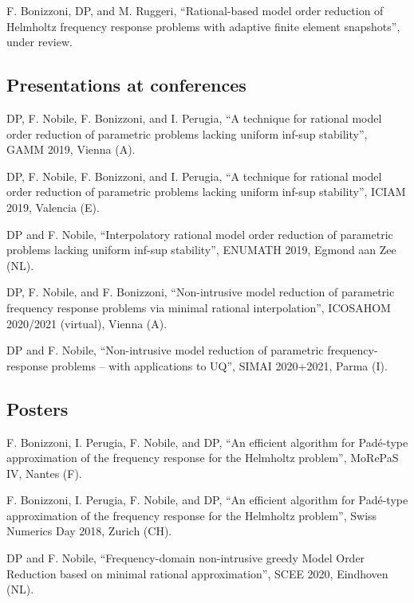\documentclass[11pt]{article} %
\begin{document}
F. Bonizzoni, DP, and M. Ruggeri, ``Rational-based model order reduction of Helmholtz frequency response problems with adaptive finite element snapshots'', under review.

\subsection*{Presentations at conferences}

\hspace{\parindent}DP, F. Nobile, F. Bonizzoni, and I. Perugia, ``A technique for rational model order reduction of parametric problems lacking uniform inf-sup stability'', GAMM 2019, Vienna (A).

DP, F. Nobile, F. Bonizzoni, and I. Perugia, ``A technique for rational model order reduction of parametric problems lacking uniform inf-sup stability'', ICIAM 2019, Valencia (E).

\yearsminus DP and F. Nobile, ``Interpolatory rational model order reduction of parametric problems lacking uniform inf-sup stability'', \mbox{ENUMATH} 2019, Egmond aan Zee (NL).

DP, F. Nobile, and F. Bonizzoni, ``Non-intrusive model reduction of parametric frequency response problems via minimal rational interpolation'', \mbox{ICOSAHOM} 2020/2021 (virtual), Vienna (A).

\yearsminus DP and F. Nobile, ``Non-intrusive model reduction of parametric frequency-response problems -- with applications to UQ'', SIMAI 2020+2021, Parma (I).

\subsection*{Posters}

\hspace{\parindent}F. Bonizzoni, I. Perugia, F. Nobile, and DP, ``An efficient algorithm for Pad\'e-type approximation of the frequency response for the Helmholtz problem'', \mbox{MoRePaS} IV, Nantes (F).

\yearsminus F. Bonizzoni, I. Perugia, F. Nobile, and DP, ``An efficient algorithm for Pad\'e-type approximation of the frequency response for the Helmholtz problem'', Swiss Numerics Day 2018, Zurich (CH).

DP and F. Nobile, ``Frequency-domain non-intrusive greedy Model Order Reduction based on minimal rational approximation'', SCEE 2020, Eindhoven (NL).
\end{document}

